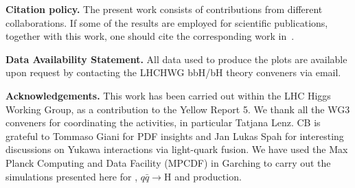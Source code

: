 \documentclass[11pt,a4paper]{article}
\begin{document}
\textbf{Citation policy. }The present work consists of contributions from different collaborations. If some of the results are employed for scientific publications, together with this work, one should cite the corresponding work in~.

\textbf{Data Availability Statement.} All data used to produce the plots are available upon request by contacting the LHCHWG bbH/bH theory conveners via email.

\textbf{Acknowledgements. }This work has been carried out within the LHC Higgs Working Group, as a contribution to the Yellow Report 5. We thank all the WG3 conveners for coordinating the activities, in particular Tatjana Lenz. CB is grateful to Tommaso Giani for PDF insights and Jan Lukas Spah for interesting discussions on Yukawa interactions via light-quark fusion. We have used the Max Planck Computing and Data Facility (MPCDF) in Garching to carry out the \minnlo{} simulations presented here for \bbtoH{}, $q\bar q\rightarrow \text{H}$ and \bbH{} production.



\end{document}
